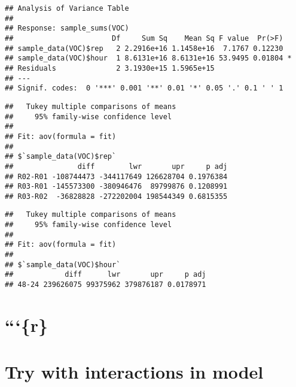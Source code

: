 \documentclass[]{article}
\newenvironment{Shaded}{\begin{snugshade}}{\end{snugshade}}
\newcommand{\KeywordTok}[1]{\textcolor[rgb]{0.13,0.29,0.53}{\textbf{#1}}}
\newcommand{\DataTypeTok}[1]{\textcolor[rgb]{0.13,0.29,0.53}{#1}}
\newcommand{\StringTok}[1]{\textcolor[rgb]{0.31,0.60,0.02}{#1}}
\newcommand{\NormalTok}[1]{#1}
\begin{document}
\begin{verbatim}
## Analysis of Variance Table
## 
## Response: sample_sums(VOC)
##                       Df     Sum Sq    Mean Sq F value  Pr(>F)  
## sample_data(VOC)$rep   2 2.2916e+16 1.1458e+16  7.1767 0.12230  
## sample_data(VOC)$hour  1 8.6131e+16 8.6131e+16 53.9495 0.01804 *
## Residuals              2 3.1930e+15 1.5965e+15                  
## ---
## Signif. codes:  0 '***' 0.001 '**' 0.01 '*' 0.05 '.' 0.1 ' ' 1
\end{verbatim}

\begin{Shaded}
\end{Shaded}

\begin{verbatim}
##   Tukey multiple comparisons of means
##     95% family-wise confidence level
## 
## Fit: aov(formula = fit)
## 
## $`sample_data(VOC)$rep`
##               diff        lwr       upr     p adj
## R02-R01 -108744473 -344117649 126628704 0.1976384
## R03-R01 -145573300 -380946476  89799876 0.1208991
## R03-R02  -36828828 -272202004 198544349 0.6815355
\end{verbatim}

\begin{Shaded}
\end{Shaded}

\begin{verbatim}
##   Tukey multiple comparisons of means
##     95% family-wise confidence level
## 
## Fit: aov(formula = fit)
## 
## $`sample_data(VOC)$hour`
##            diff      lwr       upr     p adj
## 48-24 239626075 99375962 379876187 0.0178971
\end{verbatim}

\section{```\{r\}}\label{r}

\section{Try with interactions in
model}\label{try-with-interactions-in-model}
\end{document}
